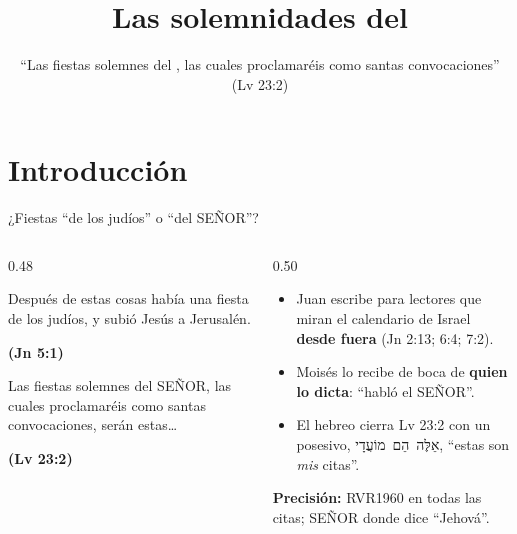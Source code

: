 \documentclass[hyperref={bookmarks=false},aspectratio=169]{beamer}
\title[Las solemnidades]{\bfseries{Las solemnidades del \SENOR}}
\subtitle{``Las fiestas solemnes del \SENOR, las cuales proclamaréis como santas convocaciones'' (Lv 23:2)}
\author{}\institute{}\date{}
\newcommand{\heb}[1]{\mbox{\foreignlanguage{hebrew}{#1}}}
\newcommand{\SENOR}{S{\fontsize{0.78em}{1em}\selectfont EÑOR}}
\newcommand{\fuente}[1]{\par\hfill{\upshape\bfseries\footnotesize\textcolor{tierraroja}{#1}}}
\newcommand{\destacar}[1]{\textbf{\textcolor{tierraroja}{#1}}}
\newcommand{\precision}[1]{{\footnotesize\color{sepia}\textbf{Precisión:} #1}}
\begin{document}
\frame{\titlepage}


\section{Introducción}

\begin{frame}{¿Fiestas ``de los judíos'' o ``del \SENOR''?}
\begin{columns}[c,onlytextwidth]
\begin{column}{0.48\textwidth}
\begin{cita}Después de estas cosas había una fiesta de los judíos, y subió Jesús a Jerusalén.\fuente{(Jn 5:1)}\end{cita}
\begin{cita}Las fiestas solemnes del \SENOR, las cuales proclamaréis como santas convocaciones, serán estas\ldots\fuente{(Lv 23:2)}\end{cita}
\end{column}
\begin{column}{0.50\textwidth}\small
\begin{itemize}
\item Juan escribe para lectores que miran el calendario de Israel \destacar{desde fuera} (Jn 2:13; 6:4; 7:2).
\item Moisés lo recibe de boca de \destacar{quien lo dicta}: ``habló el \SENOR''.
\item El hebreo cierra Lv 23:2 con un posesivo, \heb{אֵלֶּה הֵם מוֹעֲדָי}, ``estas son \emph{mis} citas''.
\end{itemize}
\precision{RVR1960 en todas las citas; \SENOR{} donde dice ``Jehová''.}
\end{column}
\end{columns}
\end{frame}
\end{document}
